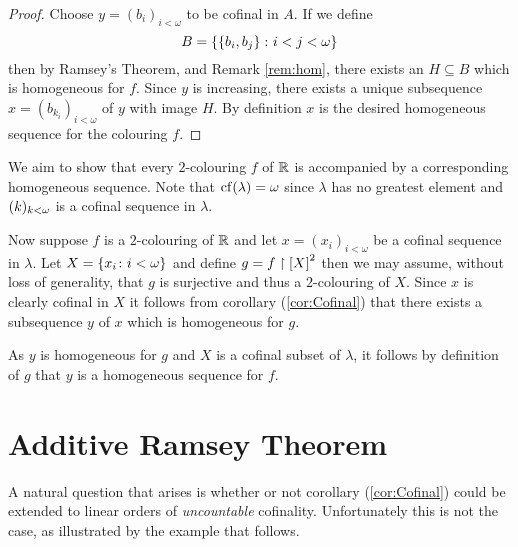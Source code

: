 \begin{proof}
	Choose $y=(b_i)_{i<\omega}$ to be cofinal in $A$.  If we define
	\begin{equation}
		B=\setbuild{\set{b_i,b_j}}{i<j<\omega}
	\end{equation}
	then by Ramsey's Theorem, and Remark \ref{rem:hom}, there exists an
	$H\subseteq B$ which is homogeneous for $f$.  Since $y$ is increasing,
	there exists a unique subsequence $x=(b_{k_i})_{i<\omega}$ of $y$ with
	image $H$.  By definition $x$ is the desired homogeneous sequence for the
	colouring $f$.
\end{proof}

\begin{exm}

	We aim to show that every $2$-colouring $f$ of $\reals$ is accompanied by a
	corresponding homogeneous sequence.  Note that $\cf(\lambda)=\omega$ since
	$\lambda$ has no greatest element and $\family{k}{k<\omega}$ is a cofinal
	sequence in $\lambda$.

	Now suppose $f$ is a $2$-colouring of $\reals$ and let $x=(x_i)_{i<\omega}$
	be a cofinal sequence in $\lambda$.  Let $X=\setbuild{x_i}{i<\omega}$ and
	define $g=f\restriction \subsets{2}{X}$ then we may assume, without loss of
	generality, that $g$ is surjective and thus a $2$-colouring of $X$.  Since
	$x$ is clearly cofinal in $X$ it follows from corollary (\ref{cor:Cofinal})
	that there exists a subsequence $y$ of $x$ which is homogeneous for $g$.

	As $y$ is homogeneous for $g$ and $X$ is a cofinal subset of $\lambda$, it
	follows by definition of $g$ that $y$ is a homogeneous sequence for $f$.

\end{exm}


\section{Additive Ramsey Theorem}

A natural question that arises is whether or not corollary (\ref{cor:Cofinal})
could be extended to linear orders of \textit{uncountable} cofinality.
Unfortunately this is not the case, as illustrated by the example that follows.

